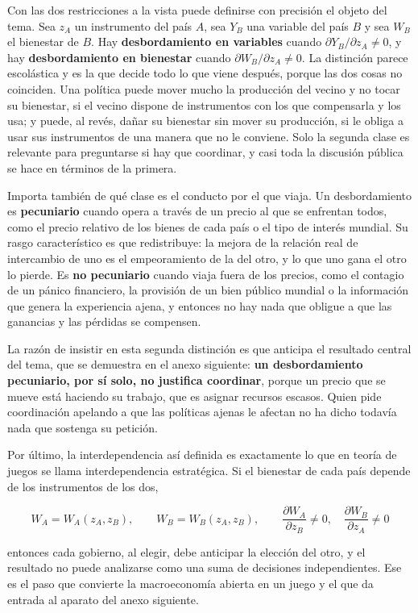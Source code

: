 \documentclass[10pt,a4paper]{article}
\newcounter{anexo}
\begin{document}
Con las dos restricciones a la vista puede definirse con precisión el objeto del tema. Sea $z_{A}$ un instrumento del país $A$, sea $Y_{B}$ una variable del país $B$ y sea $W_{B}$ el bienestar de $B$. Hay \textbf{desbordamiento en variables} cuando $\partial Y_{B}/\partial z_{A}\neq0$, y hay \textbf{desbordamiento en bienestar} cuando $\partial W_{B}/\partial z_{A}\neq0$. La distinción parece escolástica y es la que decide todo lo que viene después, porque las dos cosas no coinciden. Una política puede mover mucho la producción del vecino y no tocar su bienestar, si el vecino dispone de instrumentos con los que compensarla y los usa; y puede, al revés, dañar su bienestar sin mover su producción, si le obliga a usar sus instrumentos de una manera que no le conviene. Solo la segunda clase es relevante para preguntarse si hay que coordinar, y casi toda la discusión pública se hace en términos de la primera.

Importa también de qué clase es el conducto por el que viaja. Un desbordamiento es \textbf{pecuniario} cuando opera a través de un precio al que se enfrentan todos, como el precio relativo de los bienes de cada país o el tipo de interés mundial. Su rasgo característico es que redistribuye: la mejora de la relación real de intercambio de uno es el empeoramiento de la del otro, y lo que uno gana el otro lo pierde. Es \textbf{no pecuniario} cuando viaja fuera de los precios, como el contagio de un pánico financiero, la provisión de un bien público mundial o la información que genera la experiencia ajena, y entonces no hay nada que obligue a que las ganancias y las pérdidas se compensen.

La razón de insistir en esta segunda distinción es que anticipa el resultado central del tema, que se demuestra en el anexo siguiente: \textbf{un desbordamiento pecuniario, por sí solo, no justifica coordinar}, porque un precio que se mueve está haciendo su trabajo, que es asignar recursos escasos. Quien pide coordinación apelando a que las políticas ajenas le afectan no ha dicho todavía nada que sostenga su petición.

Por último, la interdependencia así definida es exactamente lo que en teoría de juegos se llama interdependencia estratégica. Si el bienestar de cada país depende de los instrumentos de los dos,

$$W_{A}=W_{A}(z_{A},z_{B}),\qquad W_{B}=W_{B}(z_{A},z_{B}),\qquad \frac{\partial W_{A}}{\partial z_{B}}\neq0,\quad\frac{\partial W_{B}}{\partial z_{A}}\neq0$$

entonces cada gobierno, al elegir, debe anticipar la elección del otro, y el resultado no puede analizarse como una suma de decisiones independientes. Ese es el paso que convierte la macroeconomía abierta en un juego y el que da entrada al aparato del anexo siguiente.
\end{document}
